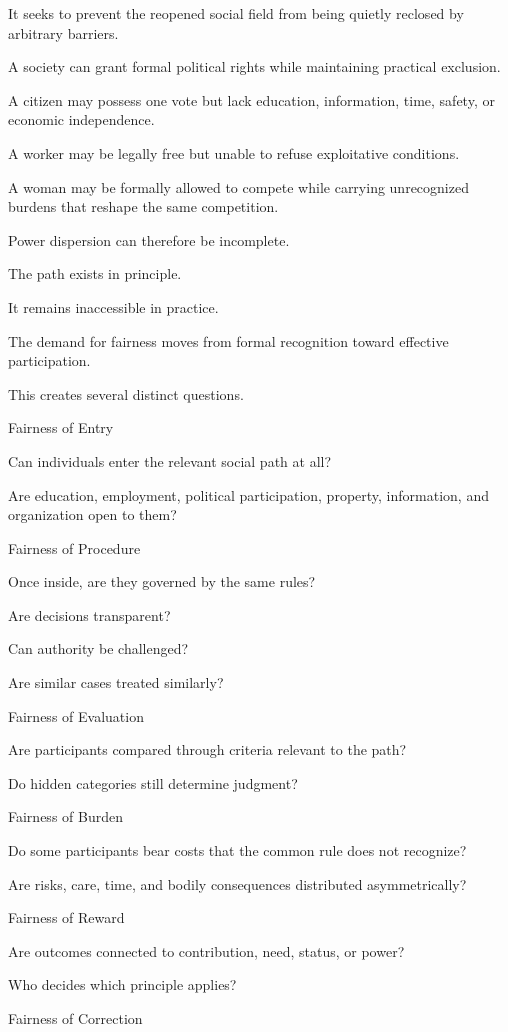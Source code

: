 It seeks to prevent the reopened social field from being quietly reclosed by arbitrary barriers.

A society can grant formal political rights while maintaining practical exclusion.

A citizen may possess one vote but lack education, information, time, safety, or economic independence.

A worker may be legally free but unable to refuse exploitative conditions.

A woman may be formally allowed to compete while carrying unrecognized burdens that reshape the same competition.

Power dispersion can therefore be incomplete.

The path exists in principle.

It remains inaccessible in practice.

The demand for fairness moves from formal recognition toward effective participation.

This creates several distinct questions.

Fairness of Entry

Can individuals enter the relevant social path at all?

Are education, employment, political participation, property, information, and organization open to them?

Fairness of Procedure

Once inside, are they governed by the same rules?

Are decisions transparent?

Can authority be challenged?

Are similar cases treated similarly?

Fairness of Evaluation

Are participants compared through criteria relevant to the path?

Do hidden categories still determine judgment?

Fairness of Burden

Do some participants bear costs that the common rule does not recognize?

Are risks, care, time, and bodily consequences distributed asymmetrically?

Fairness of Reward

Are outcomes connected to contribution, need, status, or power?

Who decides which principle applies?

Fairness of Correction

